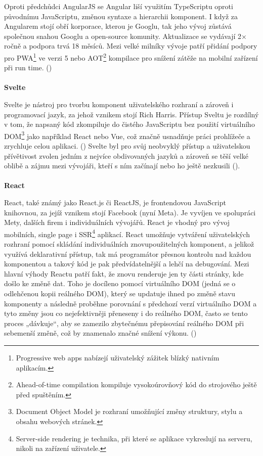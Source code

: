 \documentclass[twoside, 12pt]{article}
\begin{document}
Oproti předchůdci AngularJS se Angular liší využitím TypeScriptu oproti původnímu JavaScriptu, změnou syntaxe a hierarchii komponent. I když za Angularem stojí obří korporace, kterou je Googlu, tak jeho vývoj zůstává společnou snahou Googlu a open-source komunity. Aktualizace se vydávají 2× ročně a podpora trvá 18 měsíců. Mezi velké milníky vývoje patří přidání podpory pro PWA\footnote{Progressive web apps nabízejí uživatelský zážitek blízký nativním aplikacím.} ve verzi 5 nebo AOT\footnote{Ahead-of-time compilation kompiluje vysokoúrovňový kód do strojového ještě před spuštěním.} kompilace pro snížení zátěže na mobilní zařízení při run time. (\cite{AngularAbout})
\\
\\
\textbf{Svelte}

Svelte je nástroj pro tvorbu komponent uživatelského rozhraní a zároveň i programovací jazyk, za jehož vznikem stojí Rich Harris. Přístup Sveltu je rozdílný v tom, že napsaný kód zkompiluje do čistého JavaScriptu bez použití virtuálního DOM\footnote{Document Object Model je rozhraní umožňující změny struktury, stylu a obsahu webových stránek.} jako například React nebo Vue, což značně usnadňuje práci prohlížeče a zrychluje celou aplikaci. (\cite{Svelte}) Svelte byl pro svůj neobvyklý přístup a uživatelskou přívětivost zvolen jedním z nejvíce obdivovaných jazyků a zároveň se těší velké oblibě a zájmu mezi vývojáři, kteří s ním začínají nebo ho ještě nezkusili (\cite{SvelteSurvey}).
\\
\\
\textbf{React}

React, také známý jako React.js či ReactJS, je frontendovou JavaScript knihovnou, za jejíž vznikem stojí Facebook (nyní Meta). Je vyvíjen ve spolupráci Mety, dalších firem i individuálních vývojářů. React je vhodný pro vývoj mobilních, single page i SSR\footnote{Server-side rendering je technika, při které se aplikace vykreslují na serveru, nikoli na zařízení uživatele.} aplikací. React umožňuje vytváření uživatelských rozhraní pomocí skládání individuálních znovupoužitelných komponent, a jelikož využívá deklarativní přístup, tak má programátor přesnou kontrolu nad každou komponentou a takový kód je pak předvídatelnější a lehčí na debugování. Mezi hlavní výhody Reactu patří fakt, že znovu renderuje jen ty části stránky, kde došlo ke změně dat. Toho je docíleno pomocí virtuálního DOM (jedná se o odlehčenou kopii reálného DOM), který se updatuje ihned po změně stavu komponenty a následně proběhne porovnání s předchozí verzí virtuálního DOM a tyto změny jsou co nejefektivněji přeneseny i do reálného DOM, často se tento proces „dávkuje“, aby se zamezilo zbytečnému přepisování reálného DOM při sebemenší změně, což by znamenalo značné snížení výkonu. (\cite{React})
\end{document}
